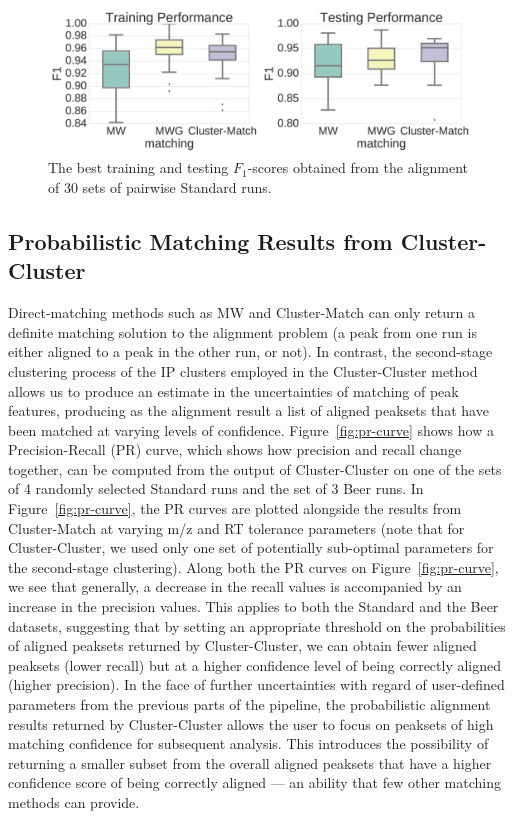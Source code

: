 \begin{figure}[!htbp]
\centering\includegraphics[width=0.75\linewidth]{05-precursor-cluster/figures/fig3.pdf}
\caption{\label{fig:pairwise-training-testing} The best training and testing $F_1$-scores obtained from the alignment of 30 sets of pairwise Standard runs.}
\end{figure}

\subsection{Probabilistic Matching Results from Cluster-Cluster\label{sub:cluster-cluster-results}}

Direct-matching methods such as MW and Cluster-Match can only return a definite matching solution to the alignment problem (a peak from one run is either aligned to a peak in the other run, or not). In contrast, the second-stage clustering process of the IP clusters employed in the Cluster-Cluster method allows us to produce an estimate in the uncertainties of matching of peak features, producing as the alignment result a list of aligned peaksets that have been matched at varying levels of confidence. Figure~\ref{fig:pr-curve} shows how a Precision-Recall (PR) curve, which shows how precision and recall change together, can be computed from the output of Cluster-Cluster on one of the sets of 4 randomly selected Standard runs and the set of 3 Beer runs. In Figure~\ref{fig:pr-curve}, the PR curves are plotted alongside the results from Cluster-Match at varying m/z and RT tolerance parameters (note that for Cluster-Cluster, we used only one set of potentially sub-optimal parameters for the second-stage clustering). Along both the PR curves on Figure~\ref{fig:pr-curve}, we see that generally, a decrease in the recall values is accompanied by an increase in the precision values. This applies to both the Standard and the Beer datasets, suggesting that by setting an appropriate threshold on the probabilities of aligned peaksets returned by Cluster-Cluster, we can obtain fewer aligned peaksets (lower recall) but at a higher confidence level of being correctly aligned (higher precision). In the face of further uncertainties with regard of user-defined parameters from the previous parts of the pipeline, the probabilistic alignment results returned by Cluster-Cluster allows the user to focus on peaksets of high matching confidence for subsequent analysis.  This introduces the possibility of returning a smaller subset from the overall aligned peaksets that have a higher confidence score of being correctly aligned --- an ability that few other matching methods can provide.

